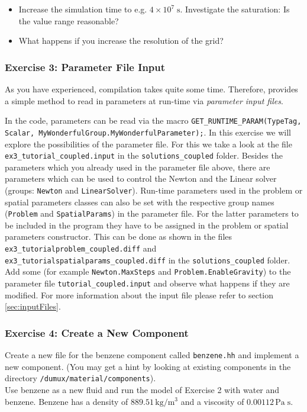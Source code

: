 \begin{itemize}
 \item Increase the simulation time to e.g. $4\times 10^7 \;\text{s}$. Investigate the saturation: Is the value range reasonable?
 \item What happens if you increase the resolution of the grid?
\end{itemize}

\subsubsection{Exercise 3: Parameter File Input}

As you have experienced, compilation takes quite some time. Therefore,
\Dumux provides a simple method to read in parameters at run-time
via \textit{parameter input files}.

In the code, parameters can be read via the macro
\texttt{GET\_RUNTIME\_PARAM(TypeTag, Scalar,
MyWonderfulGroup.MyWonderfulParameter);}. In this exercise we will explore the possibilities of the 
parameter file. For this we take a look at the file \texttt{ex3\_tutorial\_coupled.input} in the \texttt{solutions\_coupled} folder.
Besides the parameters which you already used in the parameter file above, there are parameters which can be used to control the
Newton and the Linear solver (groups: \texttt{Newton} and \texttt{LinearSolver}). Run-time parameters used in the problem or spatial parameters classes
can also be set with the respective group names (\texttt{Problem} and \texttt{SpatialParams}) in the parameter file. For the latter parameters to be included in the program
they have to be assigned in the problem or spatial parameters constructor. This can be done as shown in the files \texttt{ex3\_tutorialproblem\_coupled.diff}
and \texttt{ex3\_tutorialspatialparams\_coupled.diff} in the \texttt{solutions\_coupled} folder. Add some (for
example \texttt{Newton.MaxSteps} and \texttt{Problem.EnableGravity}) to the
parameter file \texttt{tutorial\_coupled.input} and observe what
happens if they are modified. For more information about the input file please refer to section \ref{sec:inputFiles}.

\subsubsection{Exercise 4: Create a New Component}

Create a new file for the benzene component called \texttt{benzene.hh}
and implement a new component. (You may get a hint by looking at
existing components in the directory \verb+/dumux/material/components+). \\
Use benzene as a new fluid and run the model of Exercise 2 with water
and benzene. Benzene has a density of $889.51 \, \text{kg} /
\text{m}^3$ and a viscosity of $0.00112 \, \text{Pa} \; \text{s}$.

\clearpage \newpage
